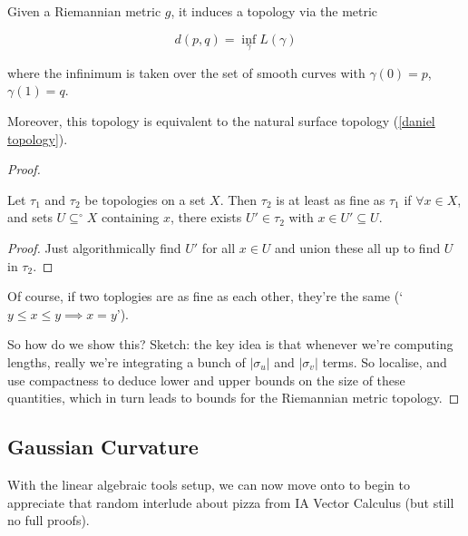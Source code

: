 \documentclass[11pt]{scrartcl}
\begin{document}
\begin{proposition}

Given a Riemannian metric $g$, it induces a topology via the metric

\begin{equation}
    d(p, q) = \inf_\gamma L(\gamma)
\end{equation}

where the infinimum is taken over the set of smooth curves with $\gamma(0)=p$, $\gamma(1)=q$.

Moreover, this topology is equivalent to the natural surface topology (\ref{daniel topology}).

\begin{proof}

\begin{lemma}
Let $\tau_1$ and $\tau_2$ be topologies on a set $X$. Then $\tau_2$ is at least as fine as $\tau_1$ if $\forall x \in X$, and sets $U \subseteq^\circ X$ containing $x$, there exists $U' \in \tau_2$ with $x \in U' \subseteq U$.

\begin{proof}
Just algorithmically find $U'$ for all $x \in U$ and union these all up to find $U$ in $\tau_2$.
\end{proof}
\end{lemma}

Of course, if two toplogies are as fine as each other, they're the same (`$y \le x \le y \implies x=y$').

So how do we show this? Sketch: the key idea is that whenever we're computing lengths, really we're integrating a bunch of $|\sigma_u|$ and $|\sigma_v|$ terms. So localise, and use compactness to deduce lower and upper bounds on the size of these quantities, which in turn leads to bounds for the Riemannian metric topology.
\end{proof}
\end{proposition}

\subsection{Gaussian Curvature}

With the linear algebraic tools setup, we can now move onto to begin to appreciate that random interlude about pizza from IA Vector Calculus (but still no full proofs).
\end{document}
